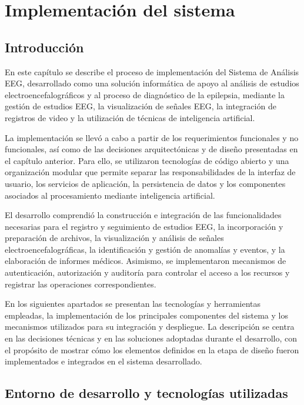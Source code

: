 \chapter{Implementación del sistema}
\label{cap:implementacion-sistema}

\section{Introducción}
\label{introduccion}

En este capítulo se describe el proceso de implementación del Sistema de Análisis EEG, desarrollado como una solución informática de apoyo al
análisis de estudios electroencefalográficos y al proceso de diagnóstico
de la epilepsia, mediante la gestión de estudios EEG,
la visualización de señales EEG, la integración de registros de video
y la utilización de técnicas de inteligencia artificial.

La implementación se llevó a cabo a partir de los requerimientos
funcionales y no funcionales, así como de las decisiones arquitectónicas
y de diseño presentadas en el capítulo anterior. Para ello, se utilizaron
tecnologías de código abierto y una organización modular que permite
separar las responsabilidades de la interfaz de usuario, los servicios
de aplicación, la persistencia de datos y los componentes asociados
al procesamiento mediante inteligencia artificial.

El desarrollo comprendió la construcción e integración de las
funcionalidades necesarias para el registro y seguimiento de estudios
EEG, la incorporación y preparación de archivos, la visualización
y análisis de señales electroencefalográficas, la identificación
y gestión de anomalías y eventos, y la elaboración de informes
médicos. Asimismo, se implementaron mecanismos de autenticación,
autorización y auditoría para controlar el acceso a los recursos
y registrar las operaciones correspondientes.

En los siguientes apartados se presentan las tecnologías y herramientas
empleadas, la implementación de los principales componentes del sistema
y los mecanismos utilizados para su integración y despliegue.
La descripción se centra en las decisiones técnicas y en las soluciones
adoptadas durante el desarrollo, con el propósito de mostrar cómo
los elementos definidos en la etapa de diseño fueron implementados
e integrados en el sistema desarrollado.


\section{Entorno de desarrollo y tecnologías utilizadas}
\label{entorno-desarrollo-tecnologias-utilizadas}

